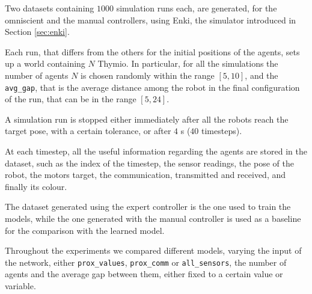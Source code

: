 Two datasets containing $1000$ simulation runs each, are generated, for the 
omniscient and the manual controllers, using Enki, the simulator introduced in 
Section \ref{sec:enki}.

Each run, that differs from the others for the initial positions of the agents, sets up 
a world containing $N$ Thymio. 
In particular, for all the simulations the number of agents $N$ is chosen randomly 
within the range $[5, 10]$, and the \texttt{avg\_gap}, that is the average distance 
among the robot in the final configuration of the run, that can be in the range 
$[5, 24]$.

A simulation run is stopped either immediately after all the robots reach the 
target pose, with a certain tolerance, or after $4$ \gls{s} ($40$ timesteps).

At each timestep, all the useful information regarding the agents are stored in the 
dataset, such as the index of the timestep, the sensor readings, the pose of the 
robot, the motors target, the communication, transmitted and received, and 
finally its colour.

The dataset generated using the expert controller is the one used to train the 
models, while the one generated with the manual controller is used as a baseline 
for the comparison with the learned model.

Throughout the experiments we compared different models, varying the input of 
the network, either \texttt{prox\_values}, \texttt{prox\_comm} or 
\texttt{all\_sensors}, the number of agents and the average gap between them, 
either fixed to a certain value or variable.




